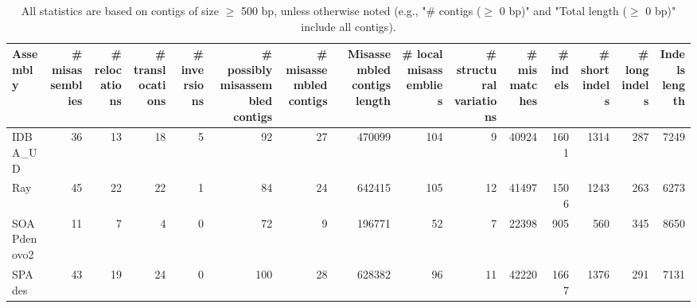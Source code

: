 \documentclass[12pt,a4paper]{article}
\begin{document}
\begin{table}[ht]
\begin{center}
\caption{All statistics are based on contigs of size $\geq$ 500 bp, unless otherwise noted (e.g., "\# contigs ($\geq$ 0 bp)" and "Total length ($\geq$ 0 bp)" include all contigs).}
\begin{tabular}{|l*{14}{|r}|}
\hline
Assembly & \# misassemblies &     \# relocations &     \# translocations &     \# inversions & \# possibly misassembled contigs & \# misassembled contigs & Misassembled contigs length & \# local misassemblies & \# structural variations & \# mismatches & \# indels &     \# short indels &     \# long indels & Indels length \\ \hline
IDBA\_UD & 36 & 13 & 18 & 5 & 92 & 27 & 470099 & 104 & 9 & 40924 & 1601 & 1314 & 287 & 7249 \\ \hline
Ray & 45 & 22 & 22 & 1 & 84 & 24 & 642415 & 105 & 12 & 41497 & 1506 & 1243 & 263 & 6273 \\ \hline
SOAPdenovo2 & 11 & 7 & 4 & 0 & 72 & 9 & 196771 & 52 & 7 & 22398 & 905 & 560 & 345 & 8650 \\ \hline
SPAdes & 43 & 19 & 24 & 0 & 100 & 28 & 628382 & 96 & 11 & 42220 & 1667 & 1376 & 291 & 7131 \\ \hline
\end{tabular}
\end{center}
\end{table}
\end{document}
